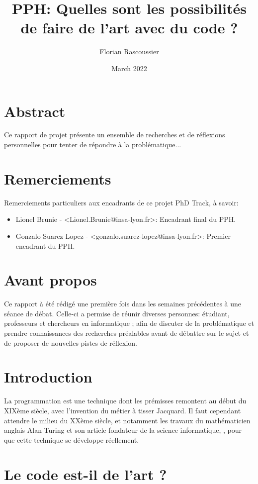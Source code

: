 \documentclass[12pt]{article} %
\title{PPH: Quelles sont les possibilités de faire de l'art avec du code ?}
\author{Florian Rascoussier}
\date{March 2022}
\begin{document}

\newpage


\newpage

\section*{Abstract}
Ce rapport de projet présente un ensemble de recherches et de réflexions personnelles pour tenter de répondre à la problématique...

\section*{Remerciements}
Remerciements particuliers aux encadrants de ce projet PhD Track, à savoir:
\begin{itemize}
    \item Lionel Brunie - <Lionel.Brunie@insa-lyon.fr>: Encadrant final  du PPH.
    \item Gonzalo Suarez Lopez - <gonzalo.suarez-lopez@insa-lyon.fr>: Premier encadrant du PPH.
\end{itemize}

\section*{Avant propos}
Ce rapport à été rédigé une première fois dans les semaines précédentes à une séance de débat. Celle-ci a permise de réunir diverses personnes: étudiant, professeurs et chercheurs en informatique ; afin de discuter de la problématique et prendre connaissances des recherches préalables avant de débattre sur le sujet et de proposer de nouvelles pistes de réflexion.

\newpage
\tableofcontents

\newpage
{} %

\section{Introduction}
La programmation est une technique dont les prémisses remontent au début du XIXème siècle, avec l'invention du métier à tisser Jacquard. Il faut cependant attendre le milieu du XXème siècle, et notamment les travaux du mathématicien anglais Alan Turing et son article fondateur de la science informatique, , pour que cette technique se développe réellement.


\section{Le code est-il de l'art ?}
\end{document}
